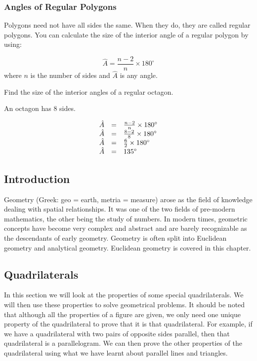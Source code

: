 \subsubsection{ Angles of Regular Polygons}
\nopagebreak
Polygons need not have all sides the same. When they do, they are called regular polygons. You can calculate the size of the interior angle of a regular polygon by using:\par 


\begin{equation*}
\hat{A}=\frac{n-2}{n}\ensuremath{\times}{180}^{\circ }
\end{equation*}
where $n$ is the number of sides and $\hat{A}$ is any angle.
\begin{wex}{}
{

Find the size of the interior angles of a regular octagon.}
{
\westep{}
An octagon has 8 sides.
\westep{}

\begin{equation*}
\begin{array}{ccc}\hfill \hat{A}& =& \frac{n-2}{n}\ensuremath{\times}{180}^{\circ }\hfill \\
 \hfill \hat{A}& =& \frac{8-2}{8}\ensuremath{\times}{180}^{\circ }\hfill \\
 \hfill \hat{A}& =& \frac{6}{2}\ensuremath{\times}{180}^{\circ }\hfill \\
 \hfill \hat{A}& =& {135}^{\circ }\hfill 
\end{array}
\end{equation*}
}
\end{wex}


\subsection{ Introduction}
\nopagebreak
Geometry (Greek: geo = earth, metria = measure) arose as the field of knowledge dealing with spatial relationships. It was one of the two fields of pre-modern mathematics, the other being the study of numbers. In modern times, geometric concepts have become very complex and abstract and are barely recognizable as the descendants of early geometry. Geometry is often split into Euclidean geometry and analytical geometry. Euclidean geometry is covered in this chapter.\par 


\subsection{ Quadrilaterals}
\nopagebreak
In this section we will look at the properties of some special quadrilaterals. We will then use these properties to solve geometrical problems. It should be noted that although all the properties of a figure are given, we only need one unique property of the quadrilateral to prove that it is that quadrilateral. For example, if we have a quadrilateral with two pairs of opposite sides parallel, then that quadrilateral is a parallelogram. We can then prove the other properties of the quadrilateral using what we have learnt about parallel lines and triangles.\par 

